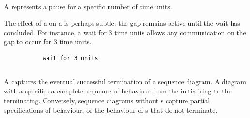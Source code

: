 \subsection{\mwaitaction}\label{ssec:metamodel-actions-waits}

A \mwaitaction{} represents a pause for a specific number of time
units.

\begin{remark}
The effect of a \msequencegap{} on a \mwaitaction{} is perhaps subtle:
the gap remains active until the wait has concluded.  For instance,
a wait for \(3\) time units allows any communication on the gap to
occur for \(3\) time units.
\end{remark} 

\begin{figure}[H]
\begin{subfigure}[t]{\egtextwidth}
\begin{lstlisting}[style=Example]
wait for 3 units
\end{lstlisting}
\end{subfigure}
\hfill
\begin{subfigure}[t]{\eggraphicalwidth}
\gsecaption
\centering
{}
\end{subfigure}

\end{figure}

\subsection{\mfinalaction}\label{ssec:metamodel-actions-final}

A \mfinalaction{} captures the eventual successful termination of a
sequence diagram.  A diagram with a \mfinalaction{} specifies a
complete sequence of behaviour from the \mtarget{} initialising to the
\mtarget{} terminating.  Conversely, sequence diagrams without
\mfinalaction s capture partial specifications of behaviour, or the
behaviour of \mtarget s that do not terminate.

